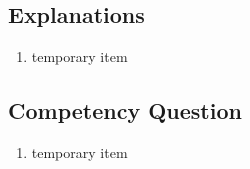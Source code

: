 \subsection{Explanations}
\label{exp:Property}
\begin{enumerate}
\item temporary item
\end{enumerate}

\subsection{Competency Question}
\label{cqs:Property}
\begin{enumerate}[CQ1.]
\item temporary item
\end{enumerate}

\newpage
